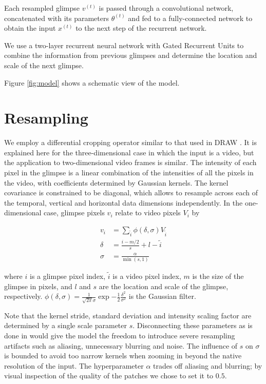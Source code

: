\documentclass{article} %
\begin{document}
Each resampled glimpse $v^{(t)}$ is passed through a convolutional network, concatenated with its parameters $\theta^{(t)}$ and fed to a fully-connected network to obtain the input $x^{(t)}$ to the next step of the recurrent network.

We use a two-layer recurrent neural network with Gated Recurrent Units\cite{Cho2014} to combine the information from previous glimpses and determine the location and scale of the next glimpse.

Figure \ref{fig:model} shows a schematic view of the model.



\section{Resampling}
\label{sec:resampling}

We employ a differential cropping operator similar to that used in DRAW \cite{draw}.
It is explained here for the three-dimensional case in which the input is
a video, but the application to two-dimensional video frames is similar.
The intensity of each pixel in the glimpse is a linear combination of the intensities of all the pixels in the video, with coefficients determined by Gaussian kernels.
The kernel covariance is constrained to be diagonal, which allows to resample across each of the temporal, vertical and horizontal data dimensions independently.
In the one-dimensional case, glimpse pixels $v_i$ relate to video pixels $V_i$ by

\begin{equation}
\begin{split}
v_i &= \sum_{\tilde{i}} \phi(\delta,\sigma) V_{\tilde{i}} \\
\delta & =  \frac{i - m/2}{s} + l - \tilde{i} \\
\sigma & =  \frac{\alpha}{\min(s, 1)}
\end{split}
\end{equation}

where $i$ is a glimpse pixel index, $\tilde{i}$ is a video pixel index, $m$ is the size of the glimpse in pixels, and $l$ and $s$ are the location and scale of the glimpse, respectively.
$\phi( \delta, \sigma ) = \frac{1}{\sqrt{2 \pi}\sigma} \exp{- \frac{1}{2} \frac{\delta^2}{\sigma^2}}$ is the Gaussian filter.

Note that the kernel stride, standard deviation and intensity scaling factor are determined by a single scale parameter $s$.
Disconnecting these parameters as is done in \cite{draw} would give the model the freedom to introduce severe resampling artifacts such as aliasing, unnecessary blurring and noise.
The influence of $s$ on $\sigma$ is bounded to avoid too narrow kernels when zooming in beyond the native resolution of the input.
The hyperparameter $\alpha$ trades off aliasing and blurring; by visual inspection of the quality of the patches we chose to set it to $0.5$.
\end{document}

